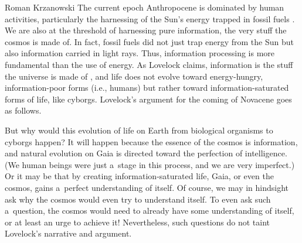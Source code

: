 \begin{newrevengenv}{Roman Krzanowski}
The current epoch Anthropocene is dominated by human activities, particularly the harnessing of the Sun's energy trapped in fossil fuels
\parencite*[][p.33]{lovelock_novacene_2019}. %
 We are also at the threshold of harnessing pure information, the very stuff the cosmos is made of. In fact, fossil fuels did not just trap energy from the Sun but also information carried in light rays. Thus, information processing is more fundamental than the use of energy. As Lovelock claims, information is the stuff the universe is made of 
\parencite*[][pp.87–89]{lovelock_novacene_2019}, %
 and life does not evolve toward energy-hungry, information-poor forms (i.e., humans) but rather toward information-saturated forms of life, like cyborgs. Lovelock's argument for the coming of Novacene goes as follows.

But why would this evolution of life on Earth from biological organisms to cyborgs happen? It will happen because the essence of the cosmos is information, and natural evolution on Gaia is directed toward the perfection of intelligence. (We human beings were just a~stage in this process, and we are very imperfect.) Or it may be that by creating information-saturated life, Gaia, or even the cosmos, gains a~perfect understanding of itself. Of course, we may in hindsight ask why the cosmos would even try to understand itself. To even ask such a~question, the cosmos would need to already have some understanding of itself, or at least an urge to achieve it! Nevertheless, such questions do not taint Lovelock's narrative and argument.


\end{newrevengenv}

